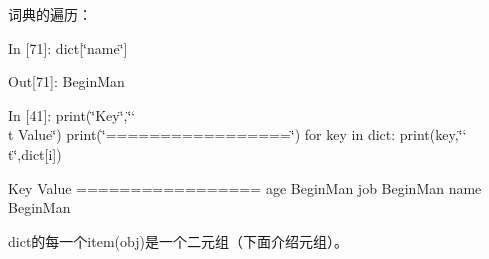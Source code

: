 \documentclass[letterpaper,10pt,english]{sphinxmanual}
\def\PYGZbs{\char`\\}
\def\PYGZsq{\char`\'}
\def\PYGZdq{\char`\"}
\renewcommand\PYGZsq{\textquotesingle}
\begin{document}
词典的遍历：

\begin{OriginalVerbatim}[commandchars=\\\{\}]
\textcolor{nbsphinxin}{In [71]: }dict[\PYGZdq{}name\PYGZdq{}]
\end{OriginalVerbatim}

\begin{OriginalVerbatim}[commandchars=\\\{\}]
\textcolor{nbsphinxout}{Out[71]: }\PYGZsq{}BeginMan\PYGZsq{}
\end{OriginalVerbatim}

\begin{OriginalVerbatim}[commandchars=\\\{\}]
\textcolor{nbsphinxin}{In [41]: }print(\PYGZdq{}Key\PYGZdq{},\PYGZdq{}\PYGZbs{}t Value\PYGZdq{})
         print(\PYGZdq{}=================\PYGZdq{})
         for key in dict:
             print(key,\PYGZdq{}\PYGZbs{}t\PYGZdq{},dict[i])
\end{OriginalVerbatim}
\begin{OriginalVerbatim}[commandchars=\\\{\}]
Key      Value
=================
age      BeginMan
job      BeginMan
name     BeginMan
\end{OriginalVerbatim}
dict的每一个item(obj)是一个二元组（下面介绍元组）。
\end{document}
